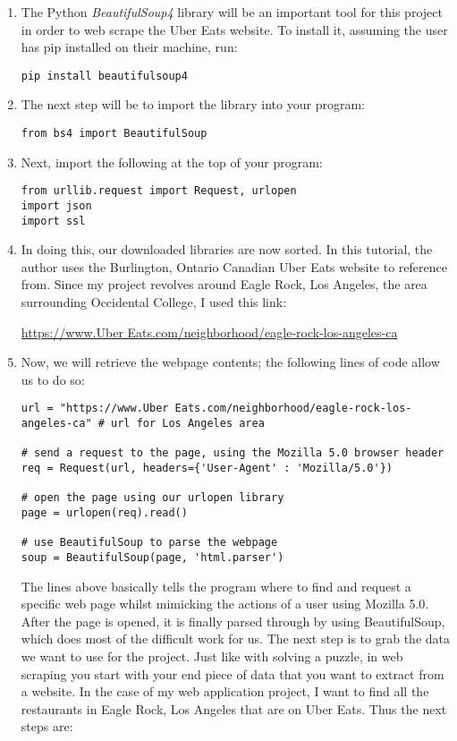 \documentclass[10pt,twocolumn]{article}
\begin{document}
\begin{enumerate}
    \item The Python \textit{BeautifulSoup4} library will be an important tool for this project in order to web scrape the Uber Eats website. To install it, assuming the user has pip installed on their machine, run:
    
\begin{lstlisting}
pip install beautifulsoup4
\end{lstlisting}

    \item The next step will be to import the library into your program:

\begin{lstlisting}
from bs4 import BeautifulSoup
\end{lstlisting}

    \item Next, import the following at the top of your program:

\begin{lstlisting}    
from urllib.request import Request, urlopen
import json
import ssl
\end{lstlisting}

    \item In doing this, our downloaded libraries are now sorted. In this tutorial, the author uses the Burlington, Ontario Canadian Uber Eats website to reference from. Since my project revolves around Eagle Rock, Los Angeles, the area surrounding Occidental College, I used this link:
    
    \url{https://www.Uber Eats.com/neighborhood/eagle-rock-los-angeles-ca}

    \item Now, we will retrieve the webpage contents; the following lines of code allow us to do so:

\begin{lstlisting}    
url = "https://www.Uber Eats.com/neighborhood/eagle-rock-los-angeles-ca" # url for Los Angeles area

# send a request to the page, using the Mozilla 5.0 browser header
req = Request(url, headers={'User-Agent' : 'Mozilla/5.0'})

# open the page using our urlopen library
page = urlopen(req).read() 

# use BeautifulSoup to parse the webpage
soup = BeautifulSoup(page, 'html.parser')
\end{lstlisting}  

The lines above basically tells the program where to find and request a specific web page whilst mimicking the actions of a user using Mozilla 5.0. After the page is opened, it is finally parsed through by using BeautifulSoup, which does most of the difficult work for us. The next step is to grab the data we want to use for the project. Just like with solving a puzzle, in web scraping you start with your end piece of data that you want to extract from a website. In the case of my web application project, I want to find all the restaurants in Eagle Rock, Los Angeles that are on Uber Eats. Thus the next steps are:


\end{enumerate}
\end{document}
